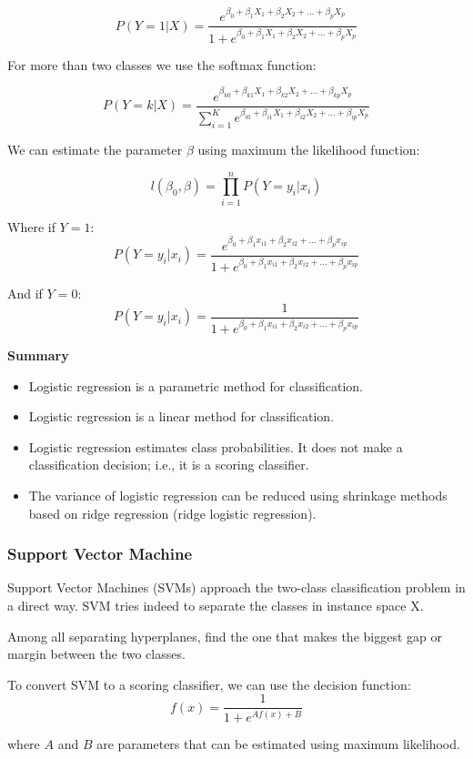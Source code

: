 $$P(Y=1|X) = \frac{e^{\beta_0 + \beta_1 X_1 + \beta_2 X_2 + ... + \beta_p X_p}}{1+e^{\beta_0 + \beta_1 X_1 + \beta_2 X_2 + ... + \beta_p X_p}}$$

For more than two classes we use the softmax function:

$$P(Y=k|X) = \frac{e^{\beta_{k0} + \beta_{k1} X_1 + \beta_{k2} X_2 + ... + \beta_{kp} X_p}}{\sum_{i=1}^K e^{\beta_{i0} + \beta_{i1} X_1 + \beta_{i2} X_2 + ... + \beta_{ip} X_p}}$$

We can estimate the parameter $\beta$ using maximum the likelihood function:

$$l(\beta_0, \beta) = \prod_{i=1}^n P(Y = y_i | x_i)$$

Where if $Y = 1$:
$$P(Y = y_i | x_i) = \frac{e^{\beta_0 + \beta_1 x_{i1} + \beta_2 x_{i2} + ... + \beta_p x_{ip}}}{1+e^{\beta_0 + \beta_1 x_{i1} + \beta_2 x_{i2} + ... + \beta_p x_{ip}}}$$

And if $Y = 0$:
$$P(Y = y_i | x_i) = \frac{1}{1+e^{\beta_0 + \beta_1 x_{i1} + \beta_2 x_{i2} + ... + \beta_p x_{ip}}}$$

\textbf{Summary}
\begin{itemize}[noitemsep]
    \item Logistic regression is a parametric method for classification.
    \item Logistic regression is a linear method for classification.
    \item Logistic regression estimates class probabilities. It does not make a classification decision; i.e., it is a scoring classifier.
    \item The variance of logistic regression can be reduced using shrinkage methods based on ridge regression (ridge logistic regression).
\end{itemize}

\subsubsection*{Support Vector Machine}
Support Vector Machines (SVMs) approach the two-class classification problem in a direct way. SVM tries indeed to separate the classes in instance space X.

Among all separating hyperplanes, find the one that makes the biggest gap or margin between the two classes.

To convert SVM to a scoring classifier, we can use the decision function:
$$f(x) = \frac{1}{1+e^{Af(x)+B}}$$

where $A$ and $B$ are parameters that can be estimated using maximum likelihood.

